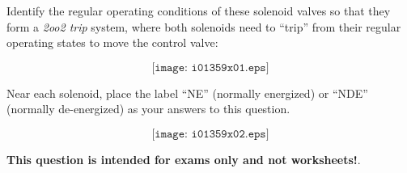 

Identify the regular operating conditions of these solenoid valves so that they form a {\it 2oo2 trip} system, where both solenoids need to ``trip'' from their regular operating states to move the control valve:

$$\texttt{[image: i01359x01.eps]}$$

Near each solenoid, place the label ``NE'' (normally energized) or ``NDE'' (normally de-energized) as your answers to this question.







$$\texttt{[image: i01359x02.eps]}$$







{\bf This question is intended for exams only and not worksheets!}.


